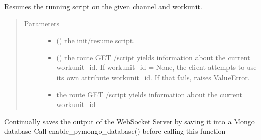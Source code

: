 \documentclass[letterpaper,10pt,english,openany,oneside]{sphinxmanual}
\begin{document}
\begin{fulllineitems}
\begin{fulllineitems}
\label{\detokenize{_modules/AconitySTUDIO_client:AconitySTUDIO_client.AconitySTUDIO_client.resume_script}}
Resumes the running script on the given channel and workunit.
\begin{quote}\begin{description}
\item[{Parameters}] \leavevmode\begin{itemize}
\item {} 
 () \textendash{} the init/resume script.

\item {} 
 () \textendash{} the route GET /script yields information about the current workunit\_id. If workunit\_id = None, the client attempts to use its own attribute workunit\_id. If that fails, raises ValueError.

\item {} 
 \textendash{} the route GET /script yields information about the current workunit\_id

\end{itemize}

\end{description}\end{quote}

\end{fulllineitems}


\begin{fulllineitems}
\label{\detokenize{_modules/AconitySTUDIO_client:AconitySTUDIO_client.AconitySTUDIO_client.save_data_to_pymongo_db}}
Continually saves the output of the WebSocket Server
by saving it into a Mongo database
Call enable\_pymongo\_database() before calling this function


\end{fulllineitems}
\end{fulllineitems}
\end{document}
